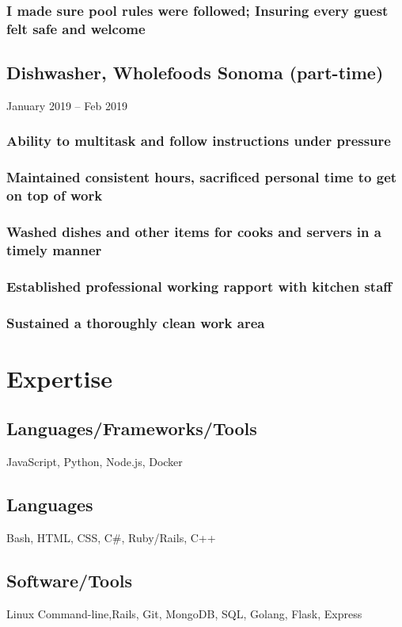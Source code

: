 \documentclass{article}
\begin{document}
		\subsubsection{I made sure pool rules were followed; Insuring every guest felt safe and welcome}

	\subsection{Dishwasher, Wholefoods Sonoma (part-time)} January 2019 – Feb 2019
		\vspace{-2mm}
		\subsubsection{Ability to multitask and follow instructions under pressure}
		\subsubsection{Maintained consistent hours, sacrificed personal time to get on top of work}
		\subsubsection{Washed dishes and other items for cooks and servers in a timely manner}
		\subsubsection{Established professional working rapport with kitchen staff}
		\subsubsection{Sustained a thoroughly clean work area}
\section{Expertise}
		\subsection{Languages/Frameworks/Tools}
		JavaScript, Python, Node.js, Docker
		\subsection{Languages}
		Bash, HTML, CSS,  C\#, Ruby/Rails, C++
		\vspace{-2mm}
		
		\subsection{Software/Tools}
		Linux Command-line,Rails, Git, MongoDB, SQL, Golang, Flask, Express
		\vspace{-3mm}
\end{document}
